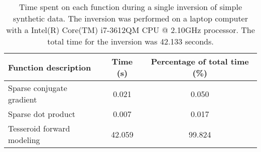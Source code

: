 
\begin{table*}
    \centering
    \caption{
        Time spent on each function during a single inversion of
        simple synthetic data.
        The inversion was performed on a laptop computer with a
        Intel(R) Core(TM) i7-3612QM CPU @ 2.10GHz processor.
        The total time for the inversion was 42.133 seconds.
        \vspace{0.4cm}
    }
    \label{profiling}
    \begin{tabular}{lcc}
        Function description & Time (s) & Percentage of total time (\%)\\
        \hline
        Sparse conjugate gradient & 0.021 & 0.050\\
        Sparse dot product & 0.007 & 0.017\\
        Tesseroid forward modeling & 42.059 & 99.824\\
        \hline
    \end{tabular}
\end{table*}
